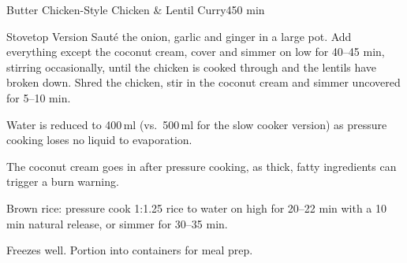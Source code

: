 \begin{recipebox}{Butter Chicken-Style Chicken \& Lentil Curry}{4}{50 min}
\begin{variationbox}{Stovetop Version}
  Saut\'e the onion, garlic and ginger in a large pot. Add everything except the coconut cream, cover and simmer on low for 40--45 min, stirring occasionally, until the chicken is cooked through and the lentils have broken down. Shred the chicken, stir in the coconut cream and simmer uncovered for 5--10 min.
\end{variationbox}

\begin{notelist}
  \item Water is reduced to 400\,ml (vs.\ 500\,ml for the slow cooker version) as pressure cooking loses no liquid to evaporation.
  \item The coconut cream goes in after pressure cooking, as thick, fatty ingredients can trigger a burn warning.
  \item Brown rice: pressure cook 1:1.25 rice to water on high for 20--22 min with a 10 min natural release, or simmer for 30--35 min.
  \item Freezes well. Portion into containers for meal prep.
\end{notelist}

\end{recipebox}
